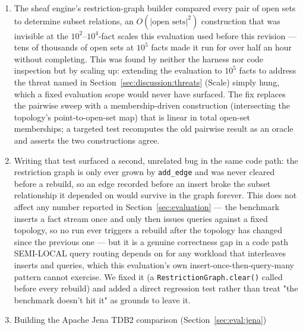 \begin{enumerate}
          semantics spelled out in SPARQL. The fix issues a full ISO
          timestamp that the shorthand does not touch, and a regression
          test now pins the suite's unbounded query to a genuinely open
          end.
    \item The sheaf engine's restriction-graph builder compared every
          pair of open sets to determine subset relations, an
          $O(|\text{open sets}|^2)$ construction that was invisible at
          the $10^2$--$10^4$-fact scales this evaluation used before this
          revision --- tens of thousands of open sets at $10^5$ facts
          made it run for over half an hour without completing. This was
          found by neither the harness nor code inspection but by scaling
          up: extending the evaluation to $10^5$ facts to address the
          threat named in Section~\ref{sec:discussion:threats} (Scale)
          simply hung, which a fixed evaluation scope would never have
          surfaced. The fix replaces the pairwise sweep with a
          membership-driven construction (intersecting the topology's
          point-to-open-set map) that is linear in total open-set
          memberships; a targeted test recomputes the old pairwise result
          as an oracle and asserts the two constructions agree.
    \item Writing that test surfaced a second, unrelated bug in the same
          code path: the restriction graph is only ever grown by
          \texttt{add\_edge} and was never cleared before a rebuild, so
          an edge recorded before an insert broke the subset relationship
          it depended on would survive in the graph forever. This does
          not affect any number reported in Section~\ref{sec:evaluation}
          --- the benchmark inserts a fact stream once and only then
          issues queries against a fixed topology, so no run ever
          triggers a rebuild after the topology has changed since the
          previous one --- but it is a genuine correctness gap in a code
          path SEMI-LOCAL query routing depends on for any workload that
          interleaves inserts and queries, which this evaluation's own
          insert-once-then-query-many pattern cannot exercise. We fixed
          it (a \texttt{RestrictionGraph.clear()} called before every
          rebuild) and added a direct regression test rather than treat
          "the benchmark doesn't hit it" as grounds to leave it.
    \item Building the Apache Jena TDB2 comparison (Section~\ref{sec:eval:jena})

\end{enumerate}
